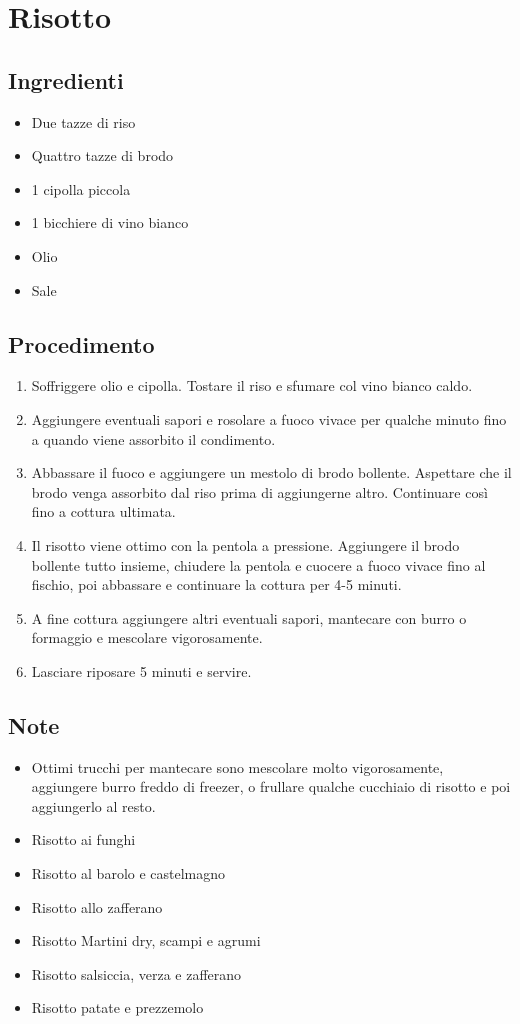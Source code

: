 \section{Risotto}
\subsection{Ingredienti}
\begin{itemize}
\item Due tazze di riso  
\item Quattro tazze di brodo  
\item 1 cipolla piccola  
\item 1 bicchiere di vino bianco  
\item Olio  
\item Sale
\end{itemize}
\subsection{Procedimento}
\begin{enumerate}
\item  Soffriggere olio e cipolla. Tostare il riso e sfumare col vino bianco caldo.   
\item  Aggiungere eventuali sapori e rosolare a fuoco vivace per qualche minuto fino a quando viene assorbito il condimento.   
\item  Abbassare il fuoco e aggiungere un mestolo di brodo bollente. Aspettare che il brodo venga assorbito dal riso prima di aggiungerne altro. Continuare così fino a cottura ultimata.  
\item  Il risotto viene ottimo con la pentola a pressione. Aggiungere il brodo bollente tutto insieme, chiudere la pentola e cuocere a fuoco vivace fino al fischio, poi abbassare e continuare la cottura per 4-5 minuti.  
\item  A fine cottura aggiungere altri eventuali sapori, mantecare con burro o formaggio e mescolare vigorosamente.  
\item  Lasciare riposare 5 minuti e servire.
\end{enumerate}
\subsection{Note}
\begin{itemize}
\item Ottimi trucchi per mantecare sono mescolare molto vigorosamente, aggiungere burro freddo di freezer, o frullare qualche cucchiaio di risotto e poi aggiungerlo al resto.  
\item Risotto ai funghi  
\item Risotto al barolo e castelmagno  
\item Risotto allo zafferano  
\item Risotto Martini dry, scampi e agrumi  
\item Risotto salsiccia, verza e zafferano  
\item Risotto patate e prezzemolo
\end{itemize}
